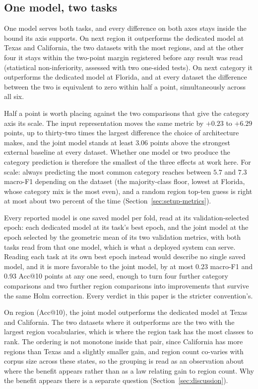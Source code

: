 \subsection{One model, two tasks}
\label{sec:results-part2}
One model serves both tasks, and every difference on both axes stays inside the bound its axis
supports. On next region it
outperforms the dedicated model at Texas and California, the two datasets with the most regions, and
at the other four it stays within the two-point margin registered before any result was read
(statistical non-inferiority, assessed with two one-sided tests). On next category it outperforms the
dedicated model at Florida, and at every dataset the difference between the two is equivalent to zero
within half a point, simultaneously across all six.

Half a point is worth placing against the two comparisons that give the category axis its scale. The
input representation moves the same metric by $+0.23$ to $+6.29$ points, up to thirty-two times the
largest difference the choice of architecture makes, and the joint model stands at least $3.06$ points
above the strongest external baseline at every dataset. Whether one model or two produce the category
prediction is therefore the smallest of the three effects at work here.
For scale: always predicting the most common category reaches between $5.7$ and $7.3$ macro-F1
depending on the dataset (the majority-class floor, lowest at Florida, whose category mix is the
most even), and a random region top-ten guess is right at most about two percent of the time
(Section~\ref{sec:setup-metrics}).

Every reported model is one saved model per fold, read at its validation-selected epoch: each
dedicated model at its task's best epoch, and the joint model at the epoch selected by the geometric
mean of its two validation metrics, with both tasks read from that one model, which is what a
deployed system can serve. Reading each task at its own best epoch instead would describe no single
saved model, and it is more favorable to the joint model, by at most $0.23$ macro-F1 and $0.93$
Acc@10 points at any one seed, enough to turn four further category comparisons and two further
region comparisons into improvements that survive the same Holm correction. Every verdict in this
paper is the stricter convention's.


On region (Acc@10), the joint model outperforms the dedicated model at Texas and California. The two
datasets where it outperforms are the two with the largest region vocabularies, which is where the
region task has the most classes to rank.
The ordering is not monotone inside that pair, since California has more regions than Texas and a
slightly smaller gain, and region count co-varies with corpus size across these states, so the
grouping is read as an observation about where the benefit appears rather than as a law relating
gain to region count. Why the benefit appears there is a separate question (Section~\ref{sec:discussion}).


